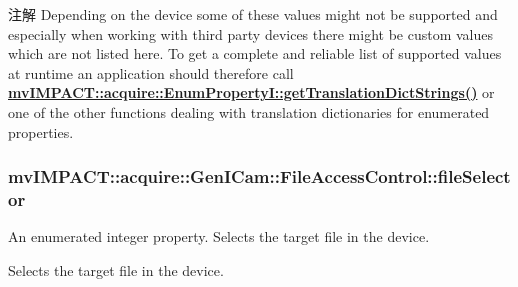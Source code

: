 \begin{DoxyNote}{注解}
Depending on the device some of these values might not be supported and especially when working with third party devices there might be custom values which are not listed here. To get a complete and reliable list of supported values at runtime an application should therefore call {\bfseries \hyperlink{classmv_i_m_p_a_c_t_1_1acquire_1_1_enum_property_i_a0ba6ccbf5ee69784d5d0b537924d26b6}{mv\+I\+M\+P\+A\+C\+T\+::acquire\+::\+Enum\+Property\+I\+::get\+Translation\+Dict\+Strings()}} or one of the other functions dealing with translation dictionaries for enumerated properties. 
\end{DoxyNote}
\hypertarget{classmv_i_m_p_a_c_t_1_1acquire_1_1_gen_i_cam_1_1_file_access_control_ac9dbcb001cea7d1cf901e71265e384e0}{
\subsubsection[{file\+Selector}]{ mv\+I\+M\+P\+A\+C\+T\+::acquire\+::\+Gen\+I\+Cam\+::\+File\+Access\+Control\+::file\+Selector}}\label{classmv_i_m_p_a_c_t_1_1acquire_1_1_gen_i_cam_1_1_file_access_control_ac9dbcb001cea7d1cf901e71265e384e0}


An enumerated integer property. Selects the target file in the device. 

Selects the target file in the device.

